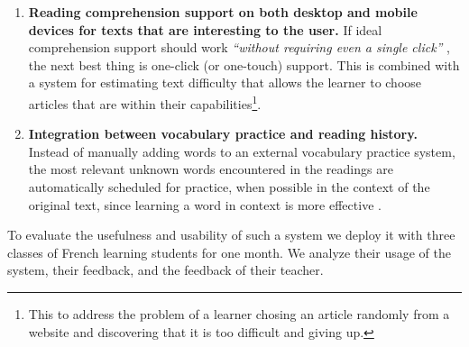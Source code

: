 \begin{enumerate}
	
  \item {\bf Reading comprehension support on both desktop and mobile devices for texts that are interesting to the user.} If ideal comprehension support should work {\em ``without requiring even a single click''} \cite{Proszeky02-Comprehension}, the next best thing is one-click (or one-touch) support. This is combined with a system for estimating text difficulty that allows the learner to choose articles that are within their capabilities\footnote{This to address the problem of a learner chosing an article randomly from a website and discovering that it is too difficult and giving up. 
  }.

  \item {\bf Integration between vocabulary practice and reading history.} Instead of manually adding words to an external vocabulary practice system, the most relevant unknown words encountered in the readings are automatically scheduled for practice, when possible in the context of the original text, since learning a word in context is more effective \cite{nagy95-context}.

\end{enumerate}

To evaluate the usefulness and usability of such a system we deploy it with three classes of French learning students for one month. We analyze their usage of the system, their feedback, and the feedback of their teacher.





